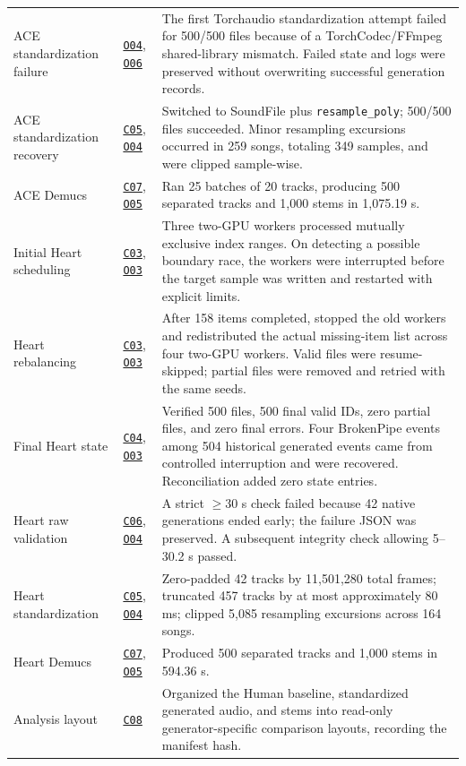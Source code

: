 \documentclass[11pt,a4paper]{article}
\newcommand{\coderef}[1]{\hyperlink{code:#1}{\texttt{#1}}}
\newcommand{\outref}[1]{\hyperlink{output:#1}{\texttt{#1}}}
\begin{document}
\begin{longtable}{p{22mm}p{36mm}p{86mm}}
ACE standardization failure & \outref{O04}, \outref{O06} & The first Torchaudio standardization attempt failed for 500/500 files because of a TorchCodec/FFmpeg shared-library mismatch. Failed state and logs were preserved without overwriting successful generation records. \\
ACE standardization recovery & \coderef{C05}, \outref{O04} & Switched to SoundFile plus \texttt{resample\_poly}; 500/500 files succeeded. Minor resampling excursions occurred in 259 songs, totaling 349 samples, and were clipped sample-wise. \\
ACE Demucs & \coderef{C07}, \outref{O05} & Ran 25 batches of 20 tracks, producing 500 separated tracks and 1,000 stems in 1,075.19 s. \\
Initial Heart scheduling & \coderef{C03}, \outref{O03} & Three two-GPU workers processed mutually exclusive index ranges. On detecting a possible boundary race, the workers were interrupted before the target sample was written and restarted with explicit limits. \\
Heart rebalancing & \coderef{C03}, \outref{O03} & After 158 items completed, stopped the old workers and redistributed the actual missing-item list across four two-GPU workers. Valid files were resume-skipped; partial files were removed and retried with the same seeds. \\
Final Heart state & \coderef{C04}, \outref{O03} & Verified 500 files, 500 final valid IDs, zero partial files, and zero final errors. Four BrokenPipe events among 504 historical generated events came from controlled interruption and were recovered. Reconciliation added zero state entries. \\
Heart raw validation & \coderef{C06}, \outref{O04} & A strict $\geq30$ s check failed because 42 native generations ended early; the failure JSON was preserved. A subsequent integrity check allowing 5--30.2 s passed. \\
Heart standardization & \coderef{C05}, \outref{O04} & Zero-padded 42 tracks by 11,501,280 total frames; truncated 457 tracks by at most approximately 80 ms; clipped 5,085 resampling excursions across 164 songs. \\
Heart Demucs & \coderef{C07}, \outref{O05} & Produced 500 separated tracks and 1,000 stems in 594.36 s. \\
Analysis layout & \coderef{C08} & Organized the Human baseline, standardized generated audio, and stems into read-only generator-specific comparison layouts, recording the manifest hash. \\

\end{longtable}
\end{document}
